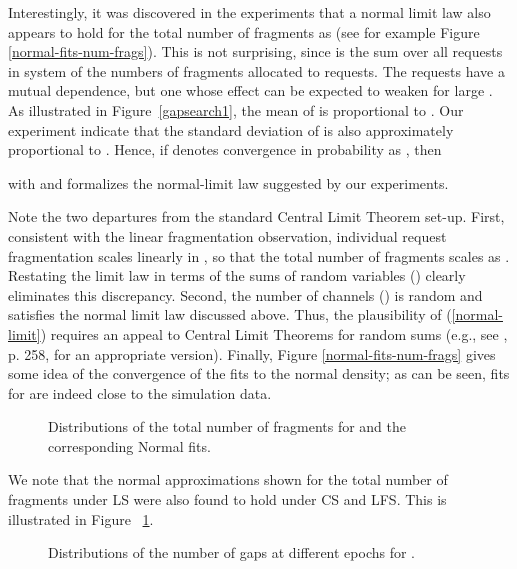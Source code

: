 \documentclass{amsart}
\begin{document}
Interestingly, it was discovered in the experiments that a normal
limit law also appears to hold for the total number  of fragments
as  (see for example Figure
\ref{normal-fits-num-frags}). This is not surprising,
since  is the sum over all requests in system of the numbers
 of fragments allocated to requests. The
requests have a mutual dependence, but one whose effect can be
expected to weaken for large . As illustrated in
Figure~\ref{gapsearch1}, the mean of
 is proportional to . Our experiment indicate that the standard deviation of  is also approximately proportional to . Hence, if
 denotes convergence in probability as , then

with  and  formalizes the normal-limit law suggested by our
experiments.


Note the two departures from the standard
Central Limit Theorem set-up. First, consistent with the linear
fragmentation observation, individual request fragmentation scales linearly
in , so that the total number of fragments scales as .
Restating the limit law in terms of the sums of random variables
() clearly eliminates this discrepancy.   Second, the
number of channels () is random and satisfies the normal limit law discussed above.  Thus, the plausibility of
(\ref{normal-limit}) requires an appeal to Central Limit Theorems
for random sums (e.g., see \cite{Feller1966}, p. 258, for an
appropriate version). Finally, Figure \ref{normal-fits-num-frags}
gives some idea of the convergence of the fits to the normal
density; as can be seen, fits for  are indeed
close to the simulation data.


\begin{figure}[!t]
\begin{center}
 \caption{Distributions of the total number of fragments for  and the corresponding Normal fits.}
 \label{fragnormal-CS-LFS}
\end{center}
\end{figure}


We note that the normal  approximations shown for the total number of fragments under LS were also found to hold under CS and LFS.  This is illustrated in Figure~ \ref{fragnormal-CS-LFS}.
\begin{figure}[!t]
\begin{center}
 \caption{Distributions of the number of gaps at different epochs for .}
 \label{dists-gap}
\end{center}
\end{figure}
\end{document}
